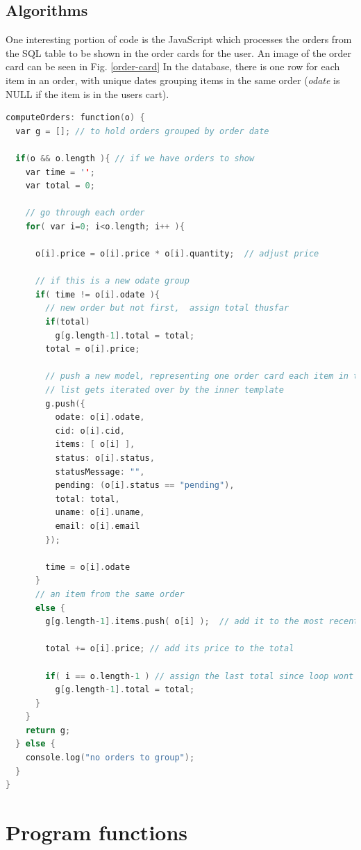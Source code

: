 \documentclass[letterpaper]{article}
\begin{document}
\subsection{Algorithms}
One interesting portion of code is the JavaScript which processes the orders from the SQL table to be shown in the order cards for the user. An image of the order card can be seen in Fig. \ref{order-card} In the database, there is one row for each item in an order, with unique dates grouping items in the same order (\textit{odate} is NULL if the item is in the users cart). 
\begin{small}
\begin{lstlisting}[language=c++]
computeOrders: function(o) {
  var g = []; // to hold orders grouped by order date
        
  if(o && o.length ){ // if we have orders to show
    var time = '';
    var total = 0;
    
    // go through each order
    for( var i=0; i<o.length; i++ ){
    
      o[i].price = o[i].price * o[i].quantity;  // adjust price
      
      // if this is a new odate group
      if( time != o[i].odate ){
        // new order but not first,  assign total thusfar
        if(total)
          g[g.length-1].total = total;
        total = o[i].price;

        // push a new model, representing one order card each item in the items 
        // list gets iterated over by the inner template
        g.push({
          odate: o[i].odate, 
          cid: o[i].cid,
          items: [ o[i] ],
          status: o[i].status,
          statusMessage: "",
          pending: (o[i].status == "pending"),
          total: total,
          uname: o[i].uname,
          email: o[i].email
        });

        time = o[i].odate
      } 
      // an item from the same order 
      else {
        g[g.length-1].items.push( o[i] );  // add it to the most recent items array

        total += o[i].price; // add its price to the total

        if( i == o.length-1 ) // assign the last total since loop wont go again
          g[g.length-1].total = total;
      }
    }
    return g;
  } else {
    console.log("no orders to group");
  }
}
\end{lstlisting}
\end{small}


\section{Program functions}
\end{document}
